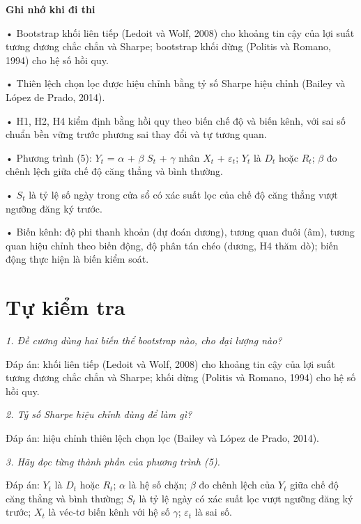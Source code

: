 \begin{tcolorbox}[breakable]
\textbf{Ghi nhớ khi đi thi}

• Bootstrap khối liên tiếp (Ledoit và Wolf, 2008) cho khoảng tin cậy của lợi suất tương đương chắc chắn và Sharpe; bootstrap khối dừng (Politis và Romano, 1994) cho hệ số hồi quy.

• Thiên lệch chọn lọc được hiệu chỉnh bằng tỷ số Sharpe hiệu chỉnh (Bailey và López de Prado, 2014).

• H1, H2, H4 kiểm định bằng hồi quy theo biến chế độ và biến kênh, với sai số chuẩn bền vững trước phương sai thay đổi và tự tương quan.

• Phương trình (5): \(Y_{t}\) = \(\alpha\) + \(\beta\) \(S_{t}\) + \(\gamma\) nhân \(X_{t}\) + \(\varepsilon_{t}\); \(Y_{t}\) là \(D_{t}\) hoặc \(R_{t}\); \(\beta\) đo chênh lệch giữa chế độ căng thẳng và bình thường.

• \(S_{t}\) là tỷ lệ số ngày trong cửa sổ có xác suất lọc của chế độ căng thẳng vượt ngưỡng đăng ký trước.

• Biến kênh: độ phi thanh khoản (dự đoán dương), tương quan đuôi (âm), tương quan hiệu chỉnh theo biến động, độ phân tán chéo (dương, H4 thăm dò); biến động thực hiện là biến kiểm soát.
\end{tcolorbox}

\section{Tự kiểm tra}

{\itshape 1. Đề cương dùng hai biến thể bootstrap nào, cho đại lượng nào?\par}

Đáp án: khối liên tiếp (Ledoit và Wolf, 2008) cho khoảng tin cậy của lợi suất tương đương chắc chắn và Sharpe; khối dừng (Politis và Romano, 1994) cho hệ số hồi quy.

{\itshape 2. Tỷ số Sharpe hiệu chỉnh dùng để làm gì?\par}

Đáp án: hiệu chỉnh thiên lệch chọn lọc (Bailey và López de Prado, 2014).

{\itshape 3. Hãy đọc từng thành phần của phương trình (5).\par}

Đáp án: \(Y_{t}\) là \(D_{t}\) hoặc \(R_{t}\); \(\alpha\) là hệ số chặn; \(\beta\) đo chênh lệch của \(Y_{t}\) giữa chế độ căng thẳng và bình thường; \(S_{t}\) là tỷ lệ ngày có xác suất lọc vượt ngưỡng đăng ký trước; \(X_{t}\) là véc-tơ biến kênh với hệ số \(\gamma\); \(\varepsilon_{t}\) là sai số.


